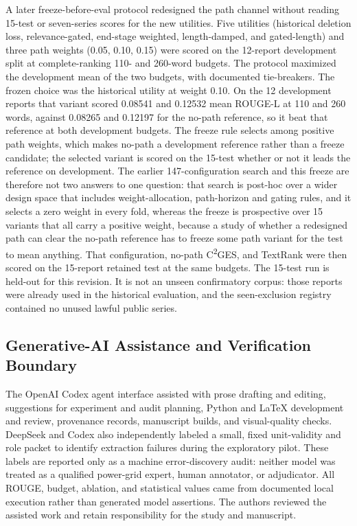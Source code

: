 \documentclass[information,article,submit,moreauthors]{Definitions/mdpi}
\newcommand{\cges}{C\textsuperscript{2}GES}
\begin{document}
A later freeze-before-eval protocol redesigned the path channel without reading 15-test or seven-series scores for the new utilities. Five utilities (historical deletion loss, relevance-gated, end-stage weighted, length-damped, and gated-length) and three path weights (0.05, 0.10, 0.15) were scored on the 12-report development split at complete-ranking 110- and 260-word budgets. The protocol maximized the development mean of the two budgets, with documented tie-breakers. The frozen choice was the historical utility at weight 0.10. On the 12 development reports that variant scored 0.08541 and 0.12532 mean ROUGE-L at 110 and 260 words, against 0.08265 and 0.12197 for the no-path reference, so it beat that reference at both development budgets. The freeze rule selects among positive path weights, which makes no-path a development reference rather than a freeze candidate; the selected variant is scored on the 15-test whether or not it leads the reference on development. The earlier 147-configuration search and this freeze are therefore not two answers to one question: that search is post-hoc over a wider design space that includes weight-allocation, path-horizon and gating rules, and it selects a zero weight in every fold, whereas the freeze is prospective over 15 variants that all carry a positive weight, because a study of whether a redesigned path can clear the no-path reference has to freeze some path variant for the test to mean anything. That configuration, no-path \cges{}, and TextRank were then scored on the 15-report retained test at the same budgets. The 15-test run is held-out for this revision. It is not an unseen confirmatory corpus: those reports were already used in the historical evaluation, and the seen-exclusion registry contained no unused lawful public series.

\subsection{Generative-AI Assistance and Verification Boundary}

The OpenAI Codex agent interface assisted with prose drafting and editing, suggestions for experiment and audit planning, Python and \LaTeX{} development and review, provenance records, manuscript builds, and visual-quality checks. DeepSeek and Codex also independently labeled a small, fixed unit-validity and role packet to identify extraction failures during the exploratory pilot. These labels are reported only as a machine error-discovery audit: neither model was treated as a qualified power-grid expert, human annotator, or adjudicator. All ROUGE, budget, ablation, and statistical values came from documented local execution rather than generated model assertions. The authors reviewed the assisted work and retain responsibility for the study and manuscript.
\end{document}
